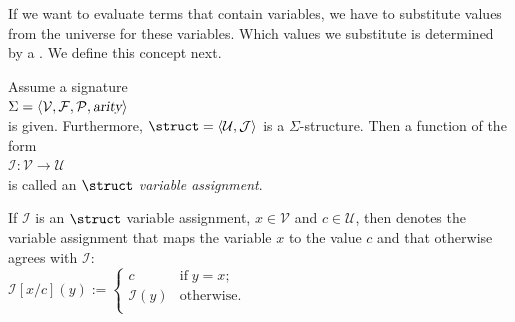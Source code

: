If we want to evaluate terms that contain variables, we have to substitute values from the universe 
for these variables. Which values we substitute is determined by a .  We define this concept next. 

\begin{Definition}
    Assume a signature \\[0.2cm]
    \hspace*{1.3cm} $\Sigma = \langle \mathcal{V}, \mathcal{F}, \mathcal{P}, \textsl{arity} \rangle$ \\[0.2cm]
    is given.  Furthermore,  $\struct = \langle \mathcal{U}, \mathcal{J} \rangle$ is a  $\Sigma$-structure.
    Then a function of the form \\[0.2cm]
    \hspace*{1.3cm} $\mathcal{I}: \mathcal{V} \rightarrow \mathcal{U}$ \\[0.2cm]
    is called an {\color{blue}$\struct$ \emph{variable assignment}}.

    If  $\mathcal{I}$ is an $\struct$ variable assignment, 
    $x \in \mathcal{V}$ and $c \in \mathcal{U}$, then  denotes the variable assignment
    that maps the variable  $x$ to the value $c$ and that otherwise agrees with $\mathcal{I}$: \\[0.2cm]
    \hspace*{1.3cm} 
    $\mathcal{I}[x/c](y) := \left\{
    \begin{array}{ll}
    c               & \mbox{if}\; y = x;  \\
    \mathcal{I}(y)  & \mbox{otherwise}.          \\
    \end{array}
    \right.$ \eox
\end{Definition}


